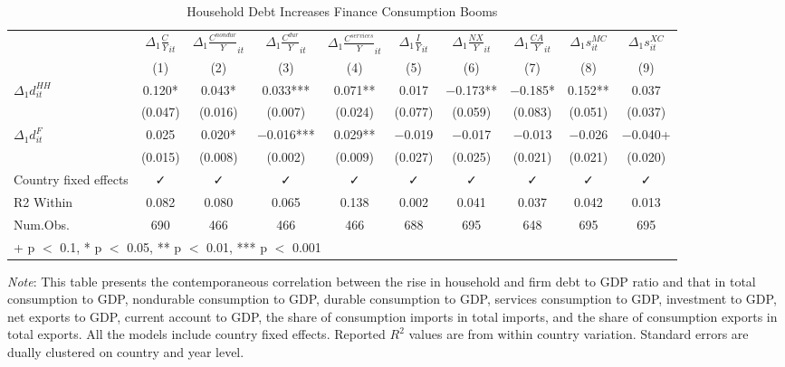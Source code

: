 \documentclass{ltjarticle}
\begin{document}
\begin{sidewaystable}
    \small
    \begin{center}
    \caption{Household Debt Increases Finance Consumption Booms}
    \label{table5}
        \begin{tabular}[h]{lccccccccc}
            \toprule
             & $\Delta_{1}\frac{C}{Y}_{it} $ & $\Delta_{1}\frac{C^{nondur}}{Y}_{it} $ & $\Delta_{1}\frac{C^{dur}}{Y}_{it}$ & $\Delta_{1}\frac{C^{services}}{Y}_{it}$ &  $\Delta_{1}\frac{I}{Y}_{it} $ & $\Delta_{1}\frac{NX}{Y}_{it}$ & $\Delta_{1}\frac{CA}{Y}_{it}$ & $\Delta_{1}s_{it}^{MC}$ & $\Delta_{1}s_{it}^{XC}$\\
              & (1) & (2) & (3) & (4) & (5) & (6) & (7) & (8) & (9)\\
            \midrule
            $\Delta_{1}d_{it}^{HH} $ & \num{0.120}* & \num{0.043}* & \num{0.033}*** & \num{0.071}** & \num{0.017} & \num{-0.173}** & \num{-0.185}* & \num{0.152}** & \num{0.037}\\
             & (\num{0.047}) & (\num{0.016}) & (\num{0.007}) & (\num{0.024}) & (\num{0.077}) & (\num{0.059}) & (\num{0.083}) & (\num{0.051}) & (\num{0.037})\\
            $\Delta_{1}d_{it}^{F} $ & \num{0.025} & \num{0.020}* & \num{-0.016}*** & \num{0.029}** & \num{-0.019} & \num{-0.017} & \num{-0.013} & \num{-0.026} & \num{-0.040}+\\
             & (\num{0.015}) & (\num{0.008}) & (\num{0.002}) & (\num{0.009}) & (\num{0.027}) & (\num{0.025}) & (\num{0.021}) & (\num{0.021}) & (\num{0.020})\\
            \midrule
            Country fixed effects & ✓ & ✓ & ✓ & ✓ & ✓ & ✓ & ✓ & ✓ & ✓\\
            R2 Within & \num{0.082} & \num{0.080} & \num{0.065} & \num{0.138} & \num{0.002} & \num{0.041} & \num{0.037} & \num{0.042} & \num{0.013}\\
            Num.Obs. & \num{690} & \num{466} & \num{466} & \num{466} & \num{688} & \num{695} & \num{648} & \num{695} & \num{695}\\
            \bottomrule
            \multicolumn{10}{l}{\rule{0pt}{1em}+ p $<$ 0.1, * p $<$ 0.05, ** p $<$ 0.01, *** p $<$ 0.001}\\
        \end{tabular}
    \end{center}
    \begin{tablenotes}
        \small
        \item \textit{Note}: This table presents the contemporaneous correlation between the rise in household and firm debt to GDP ratio and that in total consumption to GDP, nondurable consumption to GDP, durable consumption to GDP, services consumption to GDP, investment to GDP, net exports to GDP, current account to GDP, the share of consumption imports in total imports, and the share of consumption exports in total exports. All the models include country fixed effects. Reported $R^{2}$ values are from within country variation. Standard errors are dually clustered on country and year level.
    \end{tablenotes}
\end{sidewaystable}
\end{document}
